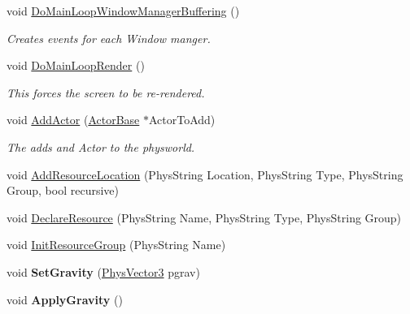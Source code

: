 \begin{DoxyCompactItemize}
void \hyperlink{classPhysWorld_ae81bab7f314d98f7b787c508e60c9c9a}{DoMainLoopWindowManagerBuffering} ()
\begin{DoxyCompactList}\small\item\em Creates events for each Window manger. \item\end{DoxyCompactList}\item 
void \hyperlink{classPhysWorld_a8f33541d67164a2452e568443e9905be}{DoMainLoopRender} ()
\begin{DoxyCompactList}\small\item\em This forces the screen to be re-\/rendered. \item\end{DoxyCompactList}\item 
void \hyperlink{classPhysWorld_ae490054b3e1c4c5aa69cb8e3b7bd2f29}{AddActor} (\hyperlink{classActorBase}{ActorBase} $\ast$ActorToAdd)
\begin{DoxyCompactList}\small\item\em The adds and Actor to the physworld. \item\end{DoxyCompactList}\item 
void \hyperlink{classPhysWorld_a757783fa596bda8ebdbc24234c6b621a}{AddResourceLocation} (PhysString Location, PhysString Type, PhysString Group, bool recursive)
\item 
void \hyperlink{classPhysWorld_a908c21f7f5452f8d7c6d4b5b2308ba5e}{DeclareResource} (PhysString Name, PhysString Type, PhysString Group)
\item 
void \hyperlink{classPhysWorld_a0b67df4c76c32b9b2bdcafdc51f6aba7}{InitResourceGroup} (PhysString Name)
\item 
\hypertarget{classPhysWorld_ab03e39a70b915d0b5a590e9e2cfbb522}{
void {\bfseries SetGravity} (\hyperlink{classPhysVector3}{PhysVector3} pgrav)}
\label{db/df5/classPhysWorld_ab03e39a70b915d0b5a590e9e2cfbb522}

\item 
\hypertarget{classPhysWorld_a6a4bcf61bd02c3863f13110c2eea3ec6}{
void {\bfseries ApplyGravity} ()}
\label{db/df5/classPhysWorld_a6a4bcf61bd02c3863f13110c2eea3ec6}

\end{DoxyCompactItemize}
